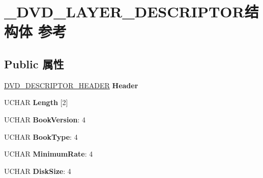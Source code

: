 \hypertarget{struct___d_v_d___l_a_y_e_r___d_e_s_c_r_i_p_t_o_r}{}\section{\+\_\+\+D\+V\+D\+\_\+\+L\+A\+Y\+E\+R\+\_\+\+D\+E\+S\+C\+R\+I\+P\+T\+O\+R结构体 参考}
\label{struct___d_v_d___l_a_y_e_r___d_e_s_c_r_i_p_t_o_r}
\subsection*{Public 属性}
\begin{DoxyCompactItemize}
\item 
\mbox{\label{struct___d_v_d___l_a_y_e_r___d_e_s_c_r_i_p_t_o_r_a9db810e7b1215ee795f626e15807d11b}} 
\hyperlink{struct___d_v_d___d_e_s_c_r_i_p_t_o_r___h_e_a_d_e_r}{D\+V\+D\+\_\+\+D\+E\+S\+C\+R\+I\+P\+T\+O\+R\+\_\+\+H\+E\+A\+D\+ER} {\bfseries Header}
\item 
\mbox{\label{struct___d_v_d___l_a_y_e_r___d_e_s_c_r_i_p_t_o_r_a7a2e3f873b2aec712db6495267929930}} 
U\+C\+H\+AR {\bfseries Length} \mbox{[}2\mbox{]}
\item 
\mbox{\label{struct___d_v_d___l_a_y_e_r___d_e_s_c_r_i_p_t_o_r_a518334d97a4bf5eccccc7b3a3e4bd8f3}} 
U\+C\+H\+AR {\bfseries Book\+Version}\+: 4
\item 
\mbox{\label{struct___d_v_d___l_a_y_e_r___d_e_s_c_r_i_p_t_o_r_a17ea14df7b7c947c602a62106521903b}} 
U\+C\+H\+AR {\bfseries Book\+Type}\+: 4
\item 
\mbox{\label{struct___d_v_d___l_a_y_e_r___d_e_s_c_r_i_p_t_o_r_a3a62d38ac00a273b3045bb0209592e38}} 
U\+C\+H\+AR {\bfseries Minimum\+Rate}\+: 4
\item 
\mbox{\label{struct___d_v_d___l_a_y_e_r___d_e_s_c_r_i_p_t_o_r_a293ef2889c354bfad776aeba22e52afe}} 
U\+C\+H\+AR {\bfseries Disk\+Size}\+: 4
\item 

\end{DoxyCompactItemize}
